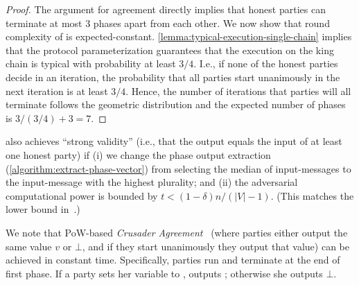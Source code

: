 \begin{proof}
    The argument for agreement directly implies that honest parties can terminate at most 3 phases apart from each other.
    We now show that round complexity of \chainKingConsensus is expected-constant.
    \cref{lemma:typical-execution-single-chain} implies that the protocol parameterization guarantees that the execution on the king chain is typical with probability at least $3 / 4$.
    I.e., if none of the honest parties decide in an iteration, the probability that all parties start unanimously in the next iteration is at least $3 / 4$.
    Hence, the number of iterations that parties will all terminate follows the geometric distribution and the expected number of phases is $3 / (3 / 4) + 3 = 7$.
\end{proof}


\begin{remark} \label{remark:strong-validity}
    \chainKingConsensus also achieves ``strong validity'' (i.e., that the output equals the input of at least one honest party) if (i) we change the phase output extraction (\cref{algorithm:extract-phase-vector}) from selecting the median of input-messages to the input-message with the highest plurality; and (ii) the adversarial computational power is bounded by $t < (1 - \delta) n / (|V| - 1)$.
    (This matches the lower bound in~\cite{PODC:FitGar03}.)
\end{remark}

\begin{remark} \label{remark:crusader-agreement}
    We note that PoW-based {\em Crusader Agreement}~\cite{JA:Dolev82} (where parties either output the same value $v$ or $\bot$, and if they start unanimously they output that value) can be achieved in constant time.
    Specifically, parties run \chainKingConsensus and terminate at the end of first phase.
    If a party \party sets her \decide variable to \true, \party outputs \val; otherwise she outputs $\bot$.
\end{remark}
